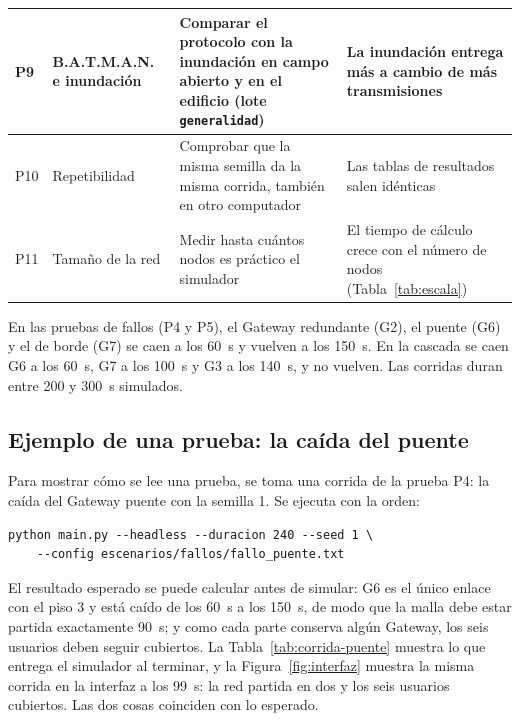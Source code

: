 {\begin{longtable}{|p{0.6cm}|p{2.6cm}|p{4.5cm}|p{5.3cm}|}
    \hline
    P9 & B.A.T.M.A.N. e inundación & Comparar el protocolo con la inundación en campo abierto y en el edificio (lote \texttt{generalidad}) & La inundación entrega más a cambio de más transmisiones \\
    \hline
    P10 & Repetibilidad & Comprobar que la misma semilla da la misma corrida, también en otro computador & Las tablas de resultados salen idénticas \\
    \hline
    P11 & Tamaño de la red & Medir hasta cuántos nodos es práctico el simulador & El tiempo de cálculo crece con el número de nodos (Tabla~\ref{tab:escala}) \\
    \hline
\end{longtable}
}

En las pruebas de fallos (P4 y P5), el Gateway redundante (G2), el puente (G6) y
el de borde (G7) se caen a los 60~s y vuelven a los 150~s. En la cascada se caen
G6 a los 60~s, G7 a los 100~s y G3 a los 140~s, y no vuelven. Las corridas duran
entre 200 y 300~s simulados.

\subsection{Ejemplo de una prueba: la caída del puente}
\label{subsec:ejemplo-prueba}

Para mostrar cómo se lee una prueba, se toma una corrida de la prueba P4: la
caída del Gateway puente con la semilla 1. Se ejecuta con la orden:

\begin{verbatim}
python main.py --headless --duracion 240 --seed 1 \
    --config escenarios/fallos/fallo_puente.txt
\end{verbatim}

El resultado esperado se puede calcular antes de simular: G6 es el único enlace
con el piso 3 y está caído de los 60~s a los 150~s, de modo que la malla debe
estar partida exactamente 90~s; y como cada parte conserva algún Gateway, los
seis usuarios deben seguir cubiertos. La Tabla~\ref{tab:corrida-puente} muestra
lo que entrega el simulador al terminar, y la Figura~\ref{fig:interfaz} muestra
la misma corrida en la interfaz a los 99~s: la red partida en dos y los seis
usuarios cubiertos. Las dos cosas coinciden con lo esperado.

